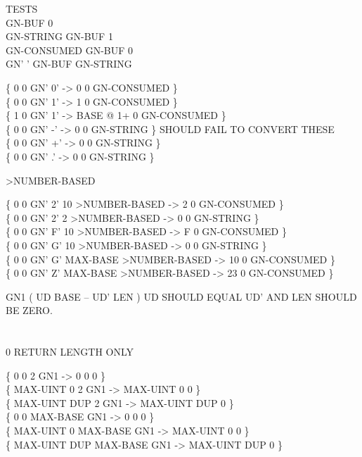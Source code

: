 \begin{tt}
  TESTS \\

 GN-BUF 0  \\
\word{:} GN-STRING	 GN-BUF 1 \word{;} \\
\word{:} GN-CONSUMED GN-BUF  0 \word{;} \\
\word{:} GN'		 \word{[CHAR]} '    GN-BUF   GN-STRING \word{;}

\{ 0 0 GN' 0'  ->         0 0 GN-CONSUMED \} \\
\{ 0 0 GN' 1'  ->         1 0 GN-CONSUMED \} \\
\{ 1 0 GN' 1'  -> BASE @ 1+ 0 GN-CONSUMED \} \\
\{ 0 0 GN' -'  ->         0 0 GN-STRING   \} \tab {} SHOULD FAIL TO CONVERT THESE \\
\{ 0 0 GN' +'  ->         0 0 GN-STRING   \} \\
\{ 0 0 GN' .'  ->         0 0 GN-STRING   \}

\word{:} >NUMBER-BASED \\
\tab {}    \word{!}    \word{!} \word{;}

\{ 0 0 GN' 2'       10 >NUMBER-BASED ->  2 0 GN-CONSUMED \} \\
\{ 0 0 GN' 2'        2 >NUMBER-BASED ->  0 0 GN-STRING   \} \\
\{ 0 0 GN' F'       10 >NUMBER-BASED ->  F 0 GN-CONSUMED \} \\
\{ 0 0 GN' G'       10 >NUMBER-BASED ->  0 0 GN-STRING   \} \\
\{ 0 0 GN' G' MAX-BASE >NUMBER-BASED -> 10 0 GN-CONSUMED \} \\
\{ 0 0 GN' Z' MAX-BASE >NUMBER-BASED -> 23 0 GN-CONSUMED \}

\word{:} GN1  ( UD BASE -- UD' LEN ) UD SHOULD EQUAL UD' AND LEN SHOULD BE ZERO. \\
\tab	{}    \word{!} \\
\tab	{}   \\
 0     \tab {} RETURN LENGTH ONLY \\
\tab	{}  \word{!} \word{;}

\{        0   0        2 GN1 ->        0   0 0 \} \\
\{ MAX-UINT   0        2 GN1 -> MAX-UINT   0 0 \} \\
\{ MAX-UINT DUP        2 GN1 -> MAX-UINT DUP 0 \} \\
\{        0   0 MAX-BASE GN1 ->        0   0 0 \} \\
\{ MAX-UINT   0 MAX-BASE GN1 -> MAX-UINT   0 0 \} \\
\{ MAX-UINT DUP MAX-BASE GN1 -> MAX-UINT DUP 0 \}


\end{tt}
